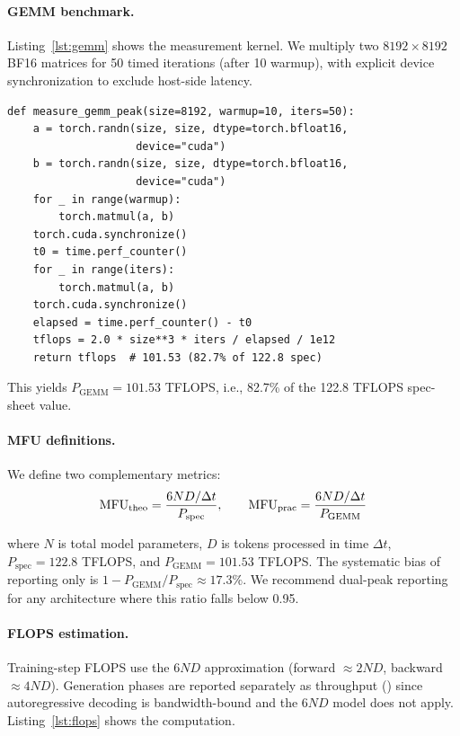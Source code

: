 \paragraph{GEMM benchmark.} Listing~\ref{lst:gemm} shows the measurement kernel. We multiply two $8192\!\times\!8192$ BF16 matrices for 50 timed iterations (after 10 warmup), with explicit device synchronization to exclude host-side latency.

\begin{lstlisting}[caption={Practical GEMM peak measurement (BF16, 8192$\times$8192).},label={lst:gemm}]
def measure_gemm_peak(size=8192, warmup=10, iters=50):
    a = torch.randn(size, size, dtype=torch.bfloat16,
                    device="cuda")
    b = torch.randn(size, size, dtype=torch.bfloat16,
                    device="cuda")
    for _ in range(warmup):
        torch.matmul(a, b)
    torch.cuda.synchronize()
    t0 = time.perf_counter()
    for _ in range(iters):
        torch.matmul(a, b)
    torch.cuda.synchronize()
    elapsed = time.perf_counter() - t0
    tflops = 2.0 * size**3 * iters / elapsed / 1e12
    return tflops  # 101.53 (82.7% of 122.8 spec)
\end{lstlisting}

\noindent This yields $P_{\text{GEMM}} = 101.53$ TFLOPS, i.e., 82.7\% of the 122.8 TFLOPS spec-sheet value.

\paragraph{MFU definitions.} We define two complementary metrics:
\begin{equation}
\text{MFU}_{\text{theo}} = \frac{6ND / \Delta t}{P_{\text{spec}}}, \qquad
\text{MFU}_{\text{prac}} = \frac{6ND / \Delta t}{P_{\text{GEMM}}}
\end{equation}

\noindent where $N$ is total model parameters, $D$ is tokens processed in time $\Delta t$, $P_{\text{spec}} = 122.8$ TFLOPS, and $P_{\text{GEMM}} = 101.53$ TFLOPS. The systematic bias of reporting only \mfutheo{} is $1 - P_{\text{GEMM}}/P_{\text{spec}} \approx 17.3\%$. We recommend dual-peak reporting for any architecture where this ratio falls below 0.95.

\paragraph{FLOPS estimation.} Training-step FLOPS use the $6ND$ approximation (forward $\approx 2ND$, backward $\approx 4ND$). Generation phases are reported separately as throughput (\toksec{}) since autoregressive decoding is bandwidth-bound and the $6ND$ model does not apply. Listing~\ref{lst:flops} shows the computation.

